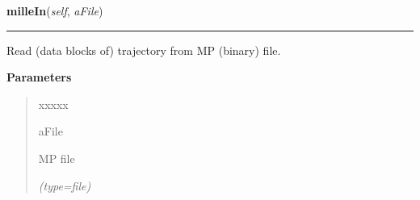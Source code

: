     \label{gblfit:GblTrajectory:milleIn}

    \vspace{0.5ex}

\hspace{.8\funcindent}\begin{boxedminipage}{\funcwidth}

    \raggedright \textbf{milleIn}(\textit{self}, \textit{aFile})

    \vspace{-1.5ex}

    \rule{\textwidth}{0.5\fboxrule}
\setlength{\parskip}{2ex}
    Read (data blocks of) trajectory from MP (binary) file.

\setlength{\parskip}{1ex}
      \textbf{Parameters}
      \vspace{-1ex}

      \begin{quote}
        \begin{Ventry}{xxxxx}

          \item[aFile]

          MP file

            {\it (type=file)}

        \end{Ventry}

      \end{quote}

    \end{boxedminipage}

    \label{gblfit:GblTrajectory:getResults}

    \vspace{0.5ex}

